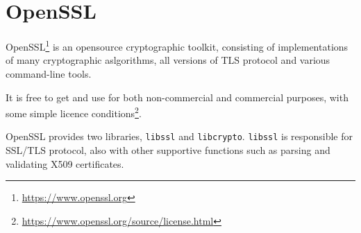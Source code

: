 \chapter{OpenSSL}

OpenSSL\footnote{\url{https://www.openssl.org}} is an opensource cryptographic toolkit, consisting of implementations of many cryptographic aslgorithms, all versions of TLS protocol and various command-line tools.

It is free to get and use for both non-commercial and commercial purposes, with some simple licence conditions\footnote{\url{https://www.openssl.org/source/license.html}}.

OpenSSL provides two libraries, \texttt{libssl} and \texttt{libcrypto}. \texttt{libssl} is responsible for SSL/TLS protocol, also with other supportive functions such as parsing and validating X509 certificates.







